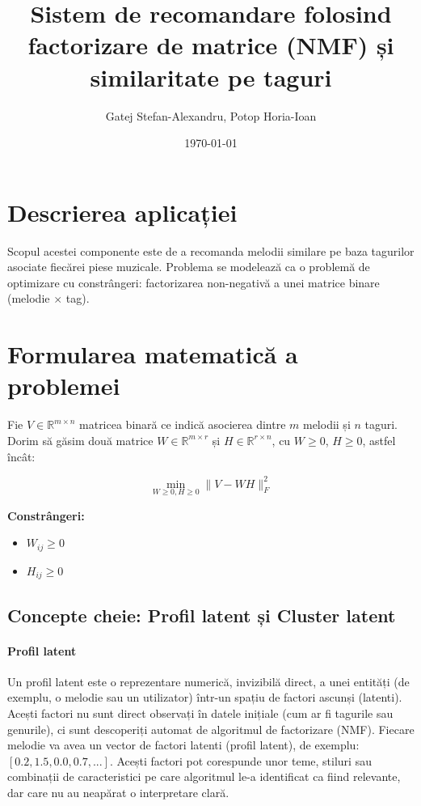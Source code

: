 \documentclass[12pt,a4paper]{article}
\title{Sistem de recomandare folosind factorizare de matrice (NMF) și similaritate pe taguri}
\author{Gatej Stefan-Alexandru, Potop Horia-Ioan}
\date{\today}
\begin{document}
	
	\maketitle
	
	\section{Descrierea aplicației}
	
	Scopul acestei componente este de a recomanda melodii similare pe baza tagurilor asociate fiecărei piese muzicale. Problema se modelează ca o problemă de optimizare cu constrângeri: factorizarea non-negativă a unei matrice binare (melodie $\times$ tag).
	
	\section{Formularea matematică a problemei}
	
	Fie $V \in \mathbb{R}^{m \times n}$ matricea binară ce indică asocierea dintre $m$ melodii și $n$ taguri. Dorim să găsim două matrice $W \in \mathbb{R}^{m \times r}$ și $H \in \mathbb{R}^{r \times n}$, cu $W \geq 0$, $H \geq 0$, astfel încât:
	
	\begin{equation}
		\min_{W \geq 0, H \geq 0} \| V - W H \|_F^2
	\end{equation}
	
	\textbf{Constrângeri:}
	\begin{itemize}
		\item $W_{ij} \geq 0$
		\item $H_{ij} \geq 0$
	\end{itemize}
	
	\subsection*{Concepte cheie: Profil latent și Cluster latent}
	
	\paragraph{Profil latent}
	Un profil latent este o reprezentare numerică, invizibilă direct, a unei entități (de exemplu, o melodie sau un utilizator) într-un spațiu de factori ascunși (latenti). Acești factori nu sunt direct observați în datele inițiale (cum ar fi tagurile sau genurile), ci sunt descoperiți automat de algoritmul de factorizare (NMF). Fiecare melodie va avea un vector de factori latenti (profil latent), de exemplu: $[0.2, 1.5, 0.0, 0.7, ...]$. Acești factori pot corespunde unor teme, stiluri sau combinații de caracteristici pe care algoritmul le-a identificat ca fiind relevante, dar care nu au neapărat o interpretare clară.
	
\end{document}
